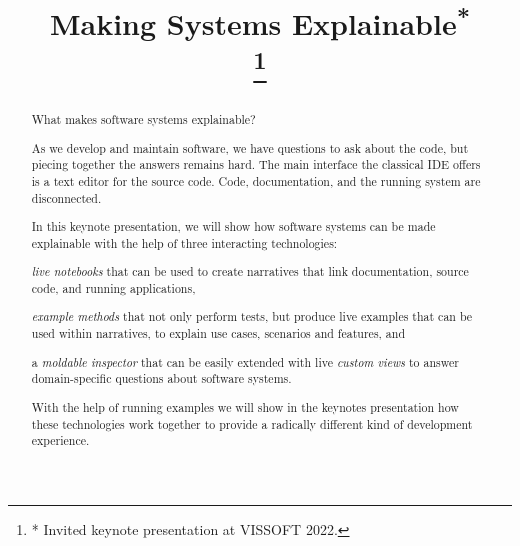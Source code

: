 \documentclass[conference]{IEEEtran}
\newcommand{\meh}[1]{\textcolor{red}{\uwave{#1}}} %
\newcommand{\meh}[1]{#1} %
\newcommand\tg[1]{\nbc{TG}{#1}{orange}} %
\begin{document}
\title{Making Systems Explainable\textsuperscript{*}\\
\thanks{* Invited keynote presentation at VISSOFT 2022.}}

\author{
\and
{}
}

\maketitle

\begin{abstract}
What makes software systems explainable?

As we develop and maintain software, we have questions to ask about the code, but piecing together the answers remains hard.
The main interface the classical IDE offers is a text editor for the source code.
Code, documentation, and the running system are disconnected.

In this keynote presentation, we will show how software systems can be made explainable with the help of three interacting technologies:
\begin{inparaenum}[(i)]
\item \emph{live notebooks} that can be used to create narratives that link documentation, source code, and running applications,
\item \emph{example methods} that not only perform tests, but produce live examples that can be used within narratives, to explain use cases, scenarios and features, and
\item a \emph{moldable inspector} that can be easily extended with live \emph{custom views} to answer domain-specific questions about software systems.
\end{inparaenum}

With the help of running examples we will show in the keynotes presentation how these technologies work together to provide a radically different kind of development experience.
\end{abstract}
\end{document}
